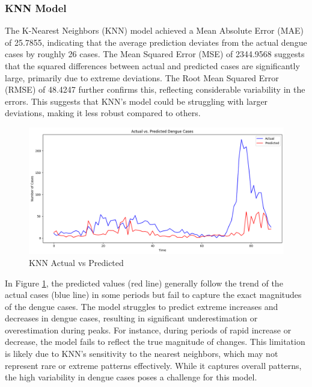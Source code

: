 \documentclass{article}
\begin{document}
\subsubsection{KNN Model}
The K-Nearest Neighbors (KNN) model achieved a Mean Absolute Error (MAE) of 25.7855, indicating that the average prediction deviates from the actual dengue cases by roughly 26 cases. The Mean Squared Error (MSE) of 2344.9568 suggests that the squared differences between actual and predicted cases are significantly large, primarily due to extreme deviations. The Root Mean Squared Error (RMSE) of 48.4247 further confirms this, reflecting considerable variability in the errors. This suggests that KNN's model could be struggling with larger deviations, making it less robust compared to others.
\begin{figure}[h!]
    \centering
    \includegraphics[width=1\linewidth]{image/knn plot.png}
    \caption{KNN Actual vs Predicted}
    \label{fig:knn}
\end{figure}

In Figure \ref{fig:knn}, the predicted values (red line) generally follow the trend of the actual cases (blue line) in some periods but fail to capture the exact magnitudes of the dengue cases. The model struggles to predict extreme increases and decreases in dengue cases, resulting in significant underestimation or overestimation during peaks. For instance, during periods of rapid increase or decrease, the model fails to reflect the true magnitude of changes. This limitation is likely due to KNN’s sensitivity to the nearest neighbors, which may not represent rare or extreme patterns effectively. While it captures overall patterns, the high variability in dengue cases poses a challenge for this model.
\end{document}
